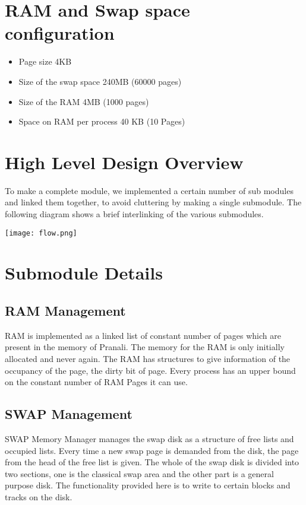 \documentclass[paper=a4, fontsize=11pt,twoside]{scrartcl}   %
\begin{document}
\section{RAM and Swap space configuration}
\begin{itemize}

\item{Page size} 4KB
\item{Size of the swap space} 240MB (60000 pages)
\item{Size of the RAM} 4MB (1000 pages)
\item{Space on RAM per process} 40 KB (10 Pages)
\end{itemize}


\newpage
\section{High Level Design Overview}
To make a complete module, we implemented a certain number of sub modules and linked them together, to avoid cluttering by making a single submodule. The following diagram shows a brief interlinking of the various submodules.

\texttt{[image: flow.png]}


\newpage



\section{Submodule Details}
    \subsection{RAM Management} RAM is implemented as a linked list of constant number of pages which are present in the memory of Pranali. The memory for the RAM is only initially allocated and never again. The RAM has structures to give information of the occupancy of the page, the dirty bit of page. Every process has an upper bound on the constant number of RAM Pages it can use.  
   
   \subsection{SWAP Management} SWAP Memory Manager manages the swap disk as a structure of free lists and occupied lists. Every time a new swap page is demanded from the disk, the page from the head of the free list is given.
    The whole of the swap disk is divided into two sections, one is the classical swap area and the other part is a general purpose disk. The functionality provided here is to write to certain blocks and tracks on the disk.
   
\end{document}

